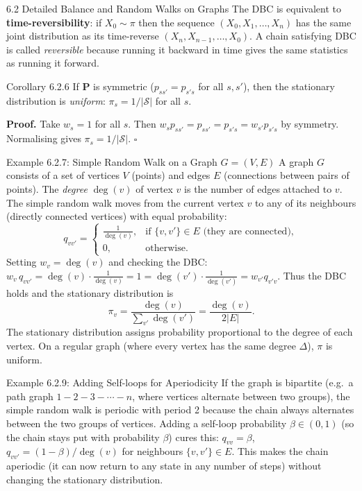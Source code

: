\documentclass[aspectratio=169,10pt]{beamer}
\newcommand{\bfP}{\mathbf{P}}
\begin{document}
\begin{frame}[allowframebreaks]{6.2 Detailed Balance and Random Walks on Graphs}
The DBC is equivalent to \textbf{time-reversibility}: if $X_0 \sim \pi$ then the sequence $(X_0, X_1, \ldots, X_n)$ has the same joint distribution as its time-reverse $(X_n, X_{n-1}, \ldots, X_0)$.
A chain satisfying DBC is called \emph{reversible} because running it backward in time gives the same statistics as running it forward.

\begin{block}{Corollary 6.2.6}
If $\bfP$ is symmetric ($p_{ss'} = p_{s's}$ for all $s,s'$), then the stationary distribution is \emph{uniform}: $\pi_s = 1/|\mathcal{S}|$ for all $s$.
\end{block}

\textbf{Proof.} Take $w_s = 1$ for all $s$.
Then $w_s p_{ss'} = p_{ss'} = p_{s's} = w_{s'} p_{s's}$ by symmetry.
Normalising gives $\pi_s = 1/|\mathcal{S}|$. $\square$

\framebreak

\begin{block}{Example 6.2.7: Simple Random Walk on a Graph $G = (V,E)$}
A graph $G$ consists of a set of vertices $V$ (points) and edges $E$ (connections between pairs of points).
The \emph{degree} $\deg(v)$ of vertex $v$ is the number of edges attached to $v$.
The simple random walk moves from the current vertex $v$ to any of its neighbours (directly connected vertices) with equal probability:
\[
  q_{vv'} = \begin{cases} \tfrac{1}{\deg(v)}, & \text{if } \{v,v'\} \in E \text{ (they are connected)}, \\ 0, & \text{otherwise.} \end{cases}
\]
Setting $w_v = \deg(v)$ and checking the DBC:
$w_v\, q_{vv'} = \deg(v) \cdot \tfrac{1}{\deg(v)} = 1 = \deg(v') \cdot \tfrac{1}{\deg(v')} = w_{v'} q_{v'v}$.
Thus the DBC holds and the stationary distribution is
\[
  \pi_v = \frac{\deg(v)}{\sum_{v'} \deg(v')} = \frac{\deg(v)}{2|E|}.
\]
The stationary distribution assigns probability proportional to the degree of each vertex.
On a regular graph (where every vertex has the same degree $\Delta$), $\pi$ is uniform.
\end{block}

\begin{block}{Example 6.2.9: Adding Self-loops for Aperiodicity}
If the graph is bipartite (e.g.\ a path graph $1-2-3-\cdots-n$, where vertices alternate between two groups), the simple random walk is periodic with period 2 because the chain always alternates between the two groups of vertices.
Adding a self-loop probability $\beta \in (0,1)$ (so the chain stays put with probability $\beta$) cures this:
$q_{vv} = \beta$, $q_{vv'} = (1-\beta)/\deg(v)$ for neighbours $\{v,v'\} \in E$.
This makes the chain aperiodic (it can now return to any state in any number of steps) without changing the stationary distribution.
\end{block}

\end{frame}
\end{document}
